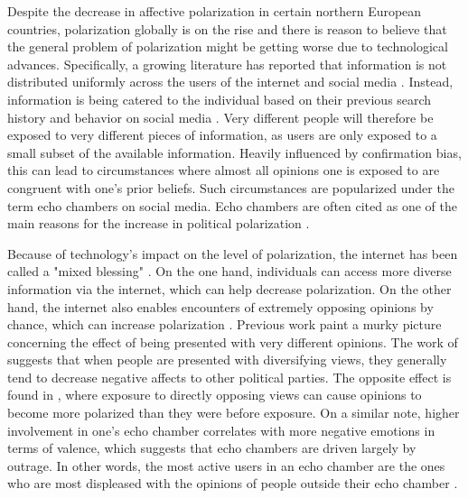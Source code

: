 \documentclass[11pt]{article}
\begin{document}
\noindent Despite the decrease in affective polarization in certain northern European countries, polarization globally is on the rise \cite{boxell_cross-country_2020,mccoy_polarization_2018, somer_deja_2018} and there is reason to believe that the general problem of polarization might be getting worse due to technological advances.
Specifically, a growing literature has reported that information is not distributed uniformly across the users of the internet and social media \cite{taylor_exploring_2018, sasahara_social_2021,baumann_modeling_2020,tsai_echo_2020}. Instead, information is being catered to the individual based on their previous search history and behavior on social media \cite{geschke2019triple}. Very different people will therefore be exposed to very different pieces of information, as users are only exposed to a small subset of the available information. 
Heavily influenced by confirmation bias, this can lead to circumstances where almost all opinions one is exposed to are congruent with one’s prior beliefs. Such circumstances are popularized under the term echo chambers on social media. Echo chambers are often cited as one of the main reasons for the increase in political polarization \cite{baumann_modeling_2020, sasahara_social_2021, tsai_echo_2020, geschke2019triple}. 

Because of technology's impact on the level of polarization, the internet has been called a "mixed blessing" \cite{lev-on_happy_2009}. On the one hand, individuals can access more diverse information via the internet, which can help decrease polarization. On the other hand, the internet also enables encounters of extremely opposing opinions by chance, which can increase polarization \cite{lev-on_happy_2009}.
Previous work paint a murky picture concerning the effect of being presented with very different opinions. The work of  suggests that when people are presented with diversifying views, they generally tend to decrease negative affects to other political parties. The opposite effect is found in , where exposure to directly opposing views can cause opinions to become more polarized than they were before exposure. 
On a similar note, higher involvement in one’s echo chamber correlates with more negative emotions in terms of valence, which suggests that echo chambers are driven largely by outrage. In other words, the most active users in an echo chamber are the ones who are most displeased with the opinions of people outside their echo chamber \cite{del_vicario_echo_2016}.
\end{document}
